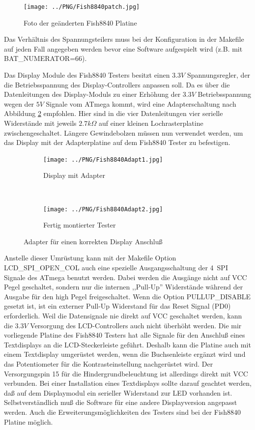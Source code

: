 \begin{figure}[H]
\centering
\texttt{[image: ../PNG/Fish8840patch.jpg]}	%
\caption{Foto der geänderten Fish8840 Platine}
\label{fig:Fish8840patch}
\end{figure}

Das Verhältnis des Spannungsteilers muss bei der Konfiguration in der Makefile auf jeden Fall angegeben
werden bevor eine Software aufgespielt wird (z.B. mit BAT\_NUMERATOR=66).

Das Display Module des Fish8840 Testers besitzt einen \(3.3V\) Spannungsregler, der die Betriebsspannung
des Display-Controllers anpassen soll.
Da es über die Datenleitungen des Display-Moduls zu einer Erhöhung der \(3.3V\) Betriebsspannung wegen
der \(5V\) Signale vom ATmega kommt,
wird eine Adapterschaltung nach Abbildung \ref{fig:Fish8840Adapt} empfohlen. Hier sind in die vier
Datenleitungen vier serielle Widerstände mit jeweils \(2.7k\Omega\) auf einer kleinen Lochrasterplatine
zwischengeschaltet.
Längere Gewindebolzen müssen nun verwendet werden, um das Display mit der Adapterplatine auf dem
Fish8840 Tester zu befestigen.

\begin{figure}[H]
  \begin{subfigure}[b]{.5\textwidth}	%
    \centering
    \texttt{[image: ../PNG/Fish8840Adapt1.jpg]}	%
    \caption{Display mit Adapter}
  \end{subfigure}
  ~
  \begin{subfigure}[b]{.5\textwidth}	%
    \centering
    \texttt{[image: ../PNG/Fish8840Adapt2.jpg]}	%
    \caption{Fertig montierter Tester}
  \end{subfigure}
  \caption{Adapter für einen korrekten Display Anschluß}
  \label{fig:Fish8840Adapt}
\end{figure}

Anstelle dieser Umrüstung kann mit der Makefile Option LCD\_SPI\_OPEN\_COL auch eine spezielle Ausgangsschaltung
der 4~SPI Signale des ATmega benutzt werden.
Dabei werden die Ausgänge nicht auf VCC Pegel geschaltet,
sondern nur die internen ,,Pull-Up'' Widerstände während der Ausgabe für den high Pegel freigeschaltet.
Wenn die Option PULLUP\_DISABLE gesetzt ist, ist ein externer Pull-Up Widerstand für das
Reset Signal (PD0) erforderlich.
Weil die Datensignale nie direkt auf VCC geschaltet werden, kann die \(3.3V\) Versorgung des LCD-Controllers
auch nicht überhöht werden.
Die mir vorliegende Platine des Fish8840 Testers hat alle Signale für den Anschluß eines
Textdisplays an die LCD-Steckerleiste geführt. 
Deshalb kann die Platine auch mit einem Textdisplay umgerüstet werden, wenn die Buchsenleiste
ergänzt wird und das Potentiometer für die Kontrasteinstellung nachgerüstet wird.
Der Versorgungspin 15 für die Hindergrundbeleuchtung ist allerdings direkt mit VCC verbunden.
Bei einer Installation eines Textdisplays sollte darauf geachtet werden, daß auf dem Displaymodul
ein serieller Widerstand zur LED vorhanden ist.
Selbstverständlich muß die Software für eine andere Displayversion angepasst werden.
Auch die Erweiterungsmöglichkeiten des Testers sind bei der Fish8840 Platine möglich.\\

